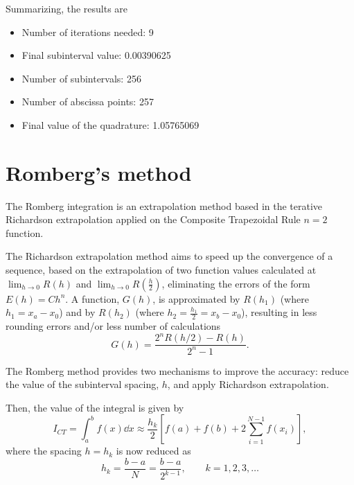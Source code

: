 Summarizing, the results are
\begin{itemize}
    \item Number of iterations needed: 9
    \item Final subinterval value: 0.00390625
    \item Number of subintervals: 256
    \item Number of abscissa points: 257
    \item Final value of the quadrature: 1.05765069
\end{itemize}

\section{Romberg's method}
The Romberg integration is an extrapolation method based in the terative Richardson
extrapolation applied on the Composite Trapezoidal Rule $n = 2$ function.

The Richardson extrapolation method aims to speed up the convergence of a sequence,
based on the extrapolation of two function values calculated at $\lim_{h \to 0} R\left( h \right)$ 
and $\lim_{h \to 0} R\left( \frac{h}{2} \right)$, eliminating the errors of the form
$E\left( h \right) = C h^n$. A function, $G\left( h \right)$, is approximated by
$R\left( h_1 \right)$ (where $h_1 = x_a - x_0$) and by $R\left( h_2 \right)$ 
(where $h_2 = \frac{h_1}{2} = x_b - x_0$), resulting in less rounding errors
and/or less number of calculations 
\begin{equation}
    G\left( h \right) = 
    \frac{ 2^{n} R\left( h / 2 \right) - R\left( h \right) }{2^{n} - 1}.
\end{equation}

The Romberg method provides two mechanisms to improve the accuracy: reduce the
value of the subinterval spacing, $h$, and apply Richardson extrapolation.

Then, the value of the integral is given by 
\begin{equation}
    I_{CT} =
    \int_a^b f\left( x \right) \dd{x} \approx
    \frac{ h_k }{2} \left[ f\left( a \right) + f\left( b \right) + 2 \sum_{i = 1}^{N - 1} f\left( x_i \right) \right],
\end{equation}
where the spacing $h = h_k$ is now reduced as 
\begin{equation}
    h_k = \frac{ b - a }{N} = \frac{ b - a }{2^{k-1}}, \qquad k = 1, 2, 3, \ldots
\end{equation}


